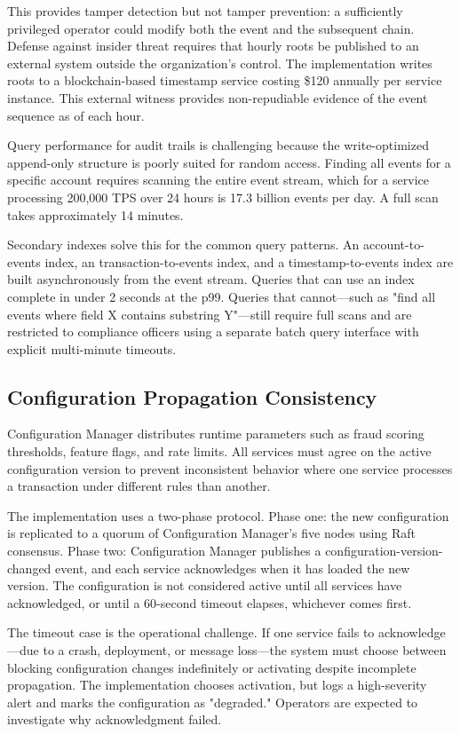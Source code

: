 This provides tamper detection but not tamper prevention: a sufficiently privileged operator could modify both the event and the subsequent chain. Defense against insider threat requires that hourly roots be published to an external system outside the organization's control. The implementation writes roots to a blockchain-based timestamp service costing \$120 annually per service instance. This external witness provides non-repudiable evidence of the event sequence as of each hour.

Query performance for audit trails is challenging because the write-optimized append-only structure is poorly suited for random access. Finding all events for a specific account requires scanning the entire event stream, which for a service processing 200,000 TPS over 24 hours is 17.3 billion events per day. A full scan takes approximately 14 minutes.

Secondary indexes solve this for the common query patterns. An account-to-events index, an transaction-to-events index, and a timestamp-to-events index are built asynchronously from the event stream. Queries that can use an index complete in under 2 seconds at the p99. Queries that cannot—such as "find all events where field X contains substring Y"—still require full scans and are restricted to compliance officers using a separate batch query interface with explicit multi-minute timeouts.

\subsection{Configuration Propagation Consistency}

Configuration Manager distributes runtime parameters such as fraud scoring thresholds, feature flags, and rate limits. All services must agree on the active configuration version to prevent inconsistent behavior where one service processes a transaction under different rules than another.

The implementation uses a two-phase protocol. Phase one: the new configuration is replicated to a quorum of Configuration Manager's five nodes using Raft consensus. Phase two: Configuration Manager publishes a configuration-version-changed event, and each service acknowledges when it has loaded the new version. The configuration is not considered active until all services have acknowledged, or until a 60-second timeout elapses, whichever comes first.

The timeout case is the operational challenge. If one service fails to acknowledge—due to a crash, deployment, or message loss—the system must choose between blocking configuration changes indefinitely or activating despite incomplete propagation. The implementation chooses activation, but logs a high-severity alert and marks the configuration as "degraded." Operators are expected to investigate why acknowledgment failed.

